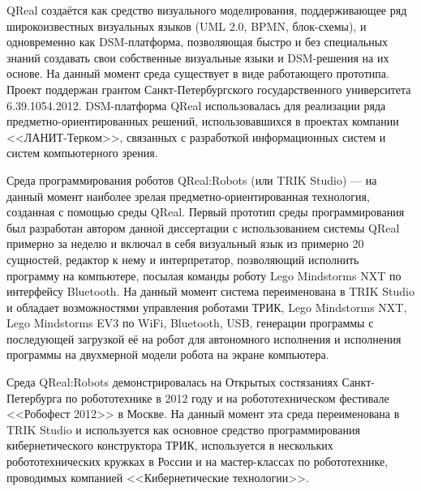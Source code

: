 QReal создаётся как средство визуального моделирования, поддерживающее ряд широкоизвестных 
визуальных языков (UML 2.0, BPMN, блок-схемы), и одновременно как DSM-платформа, 
позволяющая быстро и без специальных знаний создавать свои собственные 
визуальные языки и DSM-решения на их основе. На данный момент среда существует 
в виде работающего прототипа. Проект поддержан грантом Санкт-Петербургского 
государственного университета 6.39.1054.2012. DSM-платформа QReal использовалась
для реализации ряда предметно-ориентированных решений, использовавшихся в 
проектах компании <<ЛАНИТ-Терком>>, связанных с разработкой информационных систем 
и систем компьютерного зрения.

Среда программирования роботов QReal:Robots (или TRIK Studio) --- на данный момент наиболее зрелая 
предметно-ориентированная технология, созданная с помощью среды QReal. 
Первый прототип среды программирования был разработан автором данной диссертации
с использованием системы QReal примерно за неделю и включал в себя визуальный 
язык из примерно 20 сущностей, редактор к нему и интерпретатор, позволяющий 
исполнить программу на компьютере, посылая команды роботу Lego Mindstorms NXT по интерфейсу 
Bluetooth. На данный момент система переименована в TRIK Studio и обладает возможностями управления роботами 
ТРИК, Lego Mindstorms NXT, Lego Mindstorms EV3 по WiFi, Bluetooth, USB, генерации программы с 
последующей загрузкой её на робот для автономного исполнения и исполнения 
программы на двухмерной модели робота на экране компьютера.

Среда QReal:Robots демонстрировалась на Открытых состязаниях Санкт-Петербурга по робототехнике 
в 2012 году и на робототехническом фестивале <<Робофест 2012>> в Москве. На данный 
момент эта среда переименована в TRIK Studio и используется как основное средство 
программирования кибернетического конструктора ТРИК, используется в нескольких робототехнических 
кружках в России и на мастер-классах по робототехнике, проводимых компанией <<Кибернетические технологии>>.

